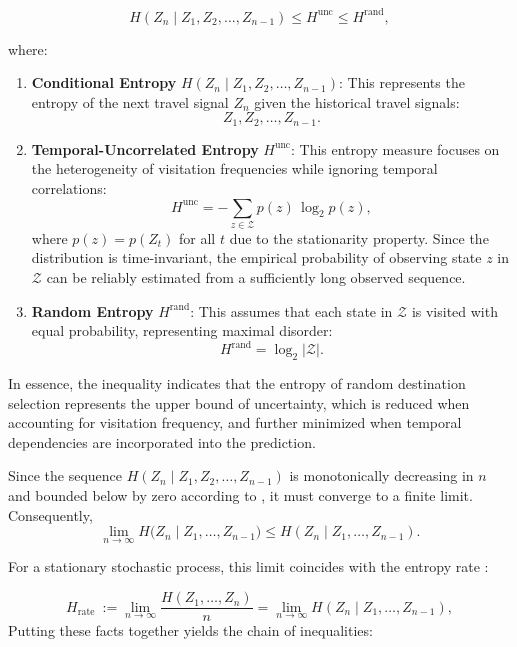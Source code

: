 \documentclass[12pt,review,authoryear]{elsarticle}
\theoremstyle{upright}
\begin{document}
\begin{equation}
H\left(Z_n \mid Z_1, Z_2, \dots, Z_{n-1}\right) \leq H^{\mathrm{unc}} \leq H^{\mathrm{rand}},
\end{equation}

\noindent where:

\begin{enumerate}[(1)]
  \item \textbf{Conditional Entropy} $H\left(Z_n \mid Z_1, Z_2, \dots, Z_{n-1}\right)$:  
  This represents the entropy of the next travel signal $Z_n$ given the historical travel signals:  \[Z_1, Z_2, \dots, Z_{n-1}.\]
  
  \item \textbf{Temporal-Uncorrelated Entropy} $H^{\mathrm{unc}}$:  
  This entropy measure focuses on the heterogeneity of visitation frequencies while ignoring temporal correlations:
  \[
    H^{\mathrm{unc}} = -\sum_{z \in \mathcal{Z}} 
    p(z)\,\log_2 p(z),
  \]
 where $p(z) = p(Z_t)$ for all $t$ due to the stationarity property. Since the distribution is time-invariant, the empirical probability of observing state $z$ in $\mathcal{Z}$ can be reliably estimated from a sufficiently long observed sequence.
  
  \item \textbf{Random Entropy} $H^{\mathrm{rand}}$:  
  This assumes that each state in $\mathcal{Z}$ is visited with equal probability, representing maximal disorder:
  \[
    H^{\mathrm{rand}} = \log_2 \lvert \mathcal{Z} \rvert.
  \]
\end{enumerate}
In essence, the inequality indicates that the entropy of random destination selection represents the upper bound of uncertainty, which is reduced when accounting for visitation frequency, and further minimized when temporal dependencies are incorporated into the prediction.

Since the sequence \(H\left(Z_n \mid Z_1, Z_2, \dots, Z_{n-1}\right) \) is monotonically decreasing in $n$ and bounded below by zero according to \citet{cover1999elements}, it must converge to a finite limit. Consequently,
$$
\lim_{n\to\infty} H\!\bigl(Z_n \mid Z_1,\dots,Z_{n-1}\bigr) \leq H\left(Z_n \mid Z_1, \ldots, Z_{n-1}\right).
$$

For a stationary stochastic process, this limit coincides with the entropy rate \citep{cover1999elements}:

$$
H_{\text {rate }}:=\lim _{n \rightarrow \infty} \frac{H\left(Z_1, \ldots, Z_n\right)}{n}=\lim _{n \rightarrow \infty} H\left(Z_n \mid Z_1, \ldots, Z_{n-1}\right),
$$
Putting these facts together yields the chain of inequalities:
\end{document}
